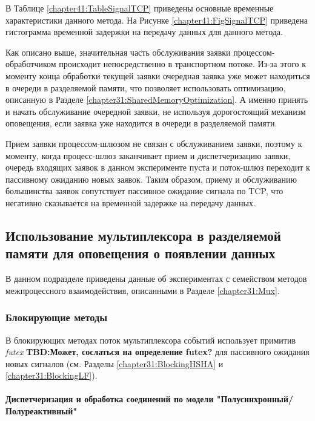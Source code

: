 В Таблице \ref{chapter41:TableSignalTCP} приведены основные временные характеристики данного метода. На Рисунке \ref{chapter41:FigSignalTCP} приведена гистограмма временной задержки на передачу данных для данного метода.

Как описано выше, значительная часть обслуживания заявки процессом-обработчиком происходит непосредственно в транспортном потоке. Из-за этого к моменту конца обработки текущей заявки очередная заявка уже может находиться в очереди в разделяемой памяти, что позволяет использовать оптимизацию, описанную в Разделе \ref{chapter31:SharedMemoryOptimization}. А именно принять и начать обслуживание очередной заявки, не используя дорогостоящий механизм оповещения, если заявка уже находится в очереди в разделяемой памяти. 

Прием заявки процессом-шлюзом не связан с обслуживанием заявки, поэтому к моменту, когда процесс-шлюз заканчивает прием и диспетчеризацию заявки, очередь входящих заявок в данном эксперименте пуста и поток-шлюз переходит к пассивному ожиданию новых заявок. Таким образом, приему и обслуживанию большинства заявок сопутствует пассивное ожидание сигнала по TCP, что негативно сказывается на временной задержке на передачу данных.

\subsection{Использование мультиплексора в разделяемой памяти для оповещения о появлении данных}

В данном подразделе приведены данные об экспериментах с семейством методов межпроцессного взаимодействия, описанными в Разделе \ref{chapter31:Mux}.

\subsubsection{Блокирующие методы}

В блокирующих методах поток мультиплексора событий использует примитив \textit{futex} 
\textbf{TBD:Может, сослаться на определение futex?}
для пассивного ожидания новых сигналов (см. Разделы \ref{chapter31:BlockingHSHA} и \ref{chapter31:BlockingLF}).

\paragraph{Диспетчеризация и обработка соединений по модели "Полусинхронный/Полуреактивный"}

